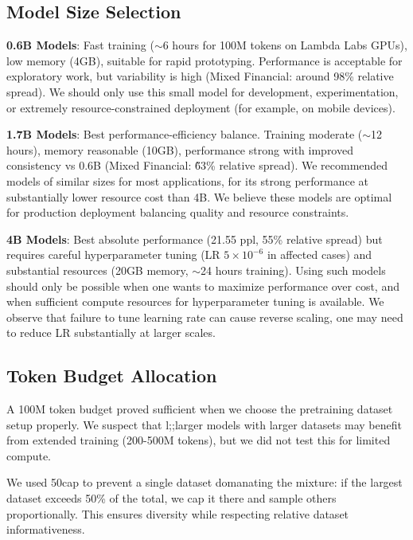 
\subsection{Model Size Selection}

\textbf{0.6B Models}: Fast training ($\sim$6 hours for 100M tokens on Lambda Labs GPUs), low memory (4GB), suitable for rapid prototyping. Performance is acceptable for exploratory work, but variability is high (Mixed Financial:  around 98\% relative spread). We should only use this small model for development, experimentation, or extremely resource-constrained deployment (for example, on mobile devices).

\textbf{1.7B Models}: Best performance-efficiency balance. Training moderate ($\sim$12 hours), memory reasonable (10GB), performance strong with improved consistency vs 0.6B (Mixed Financial: \~63\% relative spread). We recommended models of similar sizes for most applications, for its strong performance at substantially lower resource cost than 4B. We believe these models are optimal for production deployment balancing quality and resource constraints.

\textbf{4B Models}: Best absolute performance (21.55 ppl, 55\% relative spread) but requires careful hyperparameter tuning (LR $5 \times 10^{-6}$ in affected cases) and substantial resources (20GB memory, $\sim$24 hours training). Using such models should only be possible when one wants to maximize performance over cost, and when sufficient compute resources for hyperparameter tuning is available. We observe that failure to tune learning rate can cause reverse scaling, one may need to reduce LR substantially at larger scales.

\subsection{Token Budget Allocation}

A 100M token budget proved sufficient when we choose the pretraining dataset setup properly. We suspect that l;;larger models with larger datasets may benefit from extended training (200-500M tokens), but we did not test this for limited compute.

We used 50cap to prevent a single dataset domanating the mixture: if the largest dataset exceeds 50\% of the total, we cap it there and sample others proportionally. This ensures diversity while respecting relative dataset informativeness.